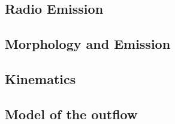 \documentclass[../template.tex]{subfiles}
\begin{document}
	\subsection{Radio Emission}
	
	\subsection{Morphology and Emission}
	
	\subsection{Kinematics}
	
	\subsection{Model of the outflow}
	
\end{document}
